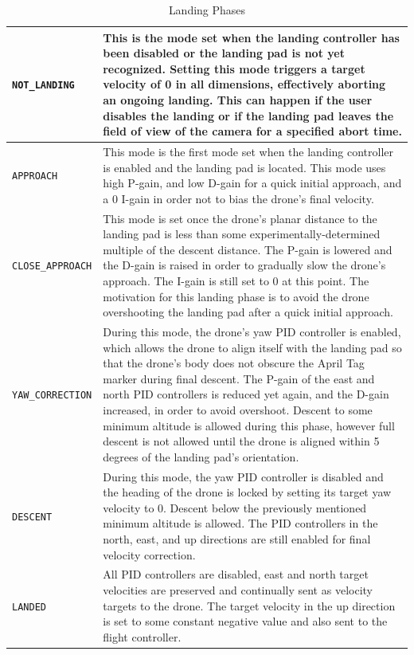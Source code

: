 \begin{table}[h!]
    \centering
    \begin{tabular}{|l|p{12cm}|}
    \hline
        \texttt{NOT\_LANDING} & This is the mode set when the landing controller has been disabled or the landing pad is not yet recognized. Setting this mode triggers a target velocity of 0 in all dimensions, effectively aborting an ongoing landing. This can happen if the user disables the landing or if the landing pad leaves the field of view of the camera for a specified abort time. \\\hline
        \texttt{APPROACH} & This mode is the first mode set when the landing controller is enabled and the landing pad is located. This mode uses high P-gain, and low D-gain for a quick initial approach, and a 0 I-gain in order not to bias the drone's final velocity. \\\hline
        \texttt{CLOSE\_APPROACH} & This mode is set once the drone's planar distance to the landing pad is less than some experimentally-determined multiple of the descent distance. The P-gain is lowered and the D-gain is raised in order to gradually slow the drone's approach. The I-gain is still set to 0 at this point. The motivation for this landing phase is to avoid the drone overshooting the landing pad after a quick initial approach. \\\hline
        \texttt{YAW\_CORRECTION} & During this mode, the drone's yaw PID controller is enabled, which allows the drone to align itself with the landing pad so that the drone's body does not obscure the April Tag marker during final descent. The P-gain of the east and north PID controllers is reduced yet again, and the D-gain increased, in order to avoid overshoot. Descent to some minimum altitude is allowed during this phase, however full descent is not allowed until the drone is aligned within 5 degrees of the landing pad's orientation. \\\hline
        \texttt{DESCENT} & During this mode, the yaw PID controller is disabled and the heading of the drone is locked by setting its target yaw velocity to 0. Descent below the previously mentioned minimum altitude is allowed. The PID controllers in the north, east, and up directions are still enabled for final velocity correction. \\\hline
        \texttt{LANDED} & All PID controllers are disabled, east and north target velocities are preserved and continually sent as velocity targets to the drone. The target velocity in the up direction is set to some constant negative value and also sent to the flight controller. \\\hline
    \end{tabular}
    \caption{Landing Phases}
    \label{tab:landing_phases}
\end{table}

